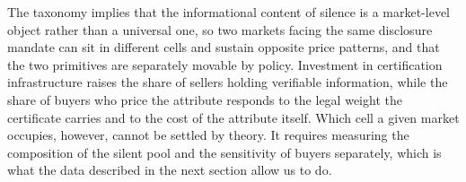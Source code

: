 The taxonomy implies that the informational content of silence is a market-level object rather than a
universal one, so two markets facing the same disclosure mandate can sit in different cells and sustain
opposite price patterns, and that the two primitives are separately movable by policy. Investment in
certification infrastructure raises the share of sellers holding verifiable information, while the
share of buyers who price the attribute responds to the legal weight the certificate carries and
to the cost of the attribute itself. Which cell a given market occupies, however, cannot be
settled by theory. It requires measuring the composition of the silent pool and the sensitivity
of buyers separately, which is what the data described in the next section allow us to do.
